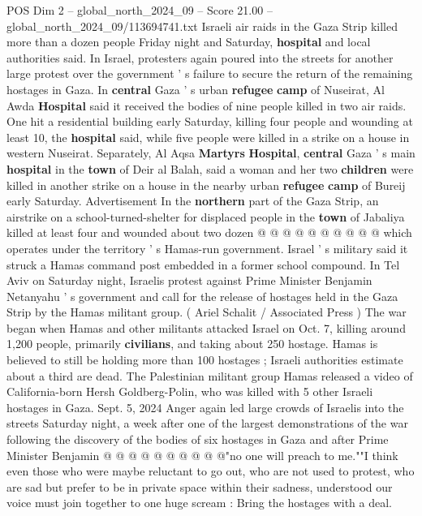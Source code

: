 \begin{textsample}{POS Dim 2 – global\_north\_2024\_09 – Score 21.00 – global\_north\_2024\_09/113694741.txt}  \label{ex:f2_pos_418}
Israeli air raids in the Gaza Strip killed more than a dozen people Friday night and Saturday, \textbf{hospital} and local authorities said.
In Israel, protesters again poured into the streets for another large protest over the government ' s failure to secure the return of the remaining hostages in Gaza.
In \textbf{central} Gaza ' s urban \textbf{refugee} \textbf{camp} of Nuseirat, Al Awda \textbf{Hospital} said it received the bodies of nine people killed in two air raids.
One hit a residential building early Saturday, killing four people and wounding at least 10, the \textbf{hospital} said, while five people were killed in a strike on a house in western Nuseirat.
Separately, Al Aqsa \textbf{Martyrs} \textbf{Hospital}, \textbf{central} Gaza ' s main \textbf{hospital} in the \textbf{town} of Deir al Balah, said a woman and her two \textbf{children} were killed in another strike on a house in the nearby urban \textbf{refugee} \textbf{camp} of Bureij early Saturday.
Advertisement In the \textbf{northern} part of the Gaza Strip, an airstrike on a school-turned-shelter for displaced people in the \textbf{town} of Jabaliya killed at least four and wounded about two dozen @ @ @ @ @ @ @ @ @ @ which operates under the territory ' s Hamas-run government.
Israel ' s military said it struck a Hamas command post embedded in a former school compound.
In Tel Aviv on Saturday night, Israelis protest against Prime Minister Benjamin Netanyahu ' s government and call for the release of hostages held in the Gaza Strip by the Hamas militant group. ( Ariel Schalit / Associated Press ) The war began when Hamas and other militants attacked Israel on Oct. 7, killing around 1,200 people, primarily \textbf{civilians}, and taking about 250 hostage.
Hamas is believed to still be holding more than 100 hostages ; Israeli authorities estimate about a third are dead.
The Palestinian militant group Hamas released a video of California-born Hersh Goldberg-Polin, who was killed with 5 other Israeli hostages in Gaza.
Sept. 5, 2024 Anger again led large crowds of Israelis into the streets Saturday night, a week after one of the largest demonstrations of the war following the discovery of the bodies of six hostages in Gaza and after Prime Minister Benjamin @ @ @ @ @ @ @ @ @ @"no one will preach to me.""I think even those who were maybe reluctant to go out, who are not used to protest, who are sad but prefer to be in private space within their sadness, understood our voice must join together to one huge scream : Bring the hostages with a deal.

\end{textsample}
